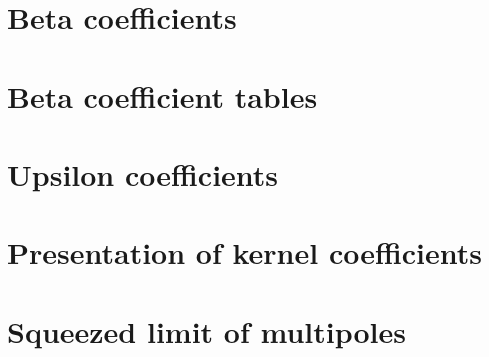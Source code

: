 \begin{appendices}
%
\chapter{Beta coefficients}
\label{app_betas}
%

%
\chapter{Beta coefficient tables}
\label{app_betatables}
%

%
\chapter{Upsilon coefficients}
\label{app_pngb}
%

%
% 
%
\chapter{Presentation of kernel coefficients}
\label{app_kernelpres}
%

%
\chapter{Squeezed limit of multipoles}
\label{app_sqlimmultip}
%

%
% 
%
% 
%
\end{appendices}
